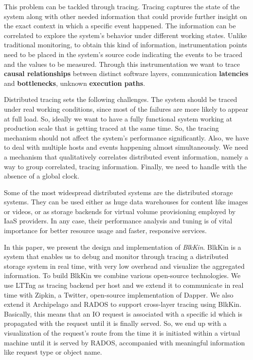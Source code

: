 \documentclass[a4paper,10pt,twocolumn]{article}
\begin{document}
This problem can be tackled through tracing. Tracing captures the state of the
system along with other needed information that could provide further insight on
the exact context in which a specific event happened. The information can be
correlated to explore the system's behavior under different working states.
Unlike traditional monitoring, to obtain this kind of information,
instrumentation points need to be placed in the system's source code indicating
the events to be traced and the values to be measured. Through this
instrumentation we want to trace \textbf{causal relationships} between distinct
software layers, communication \textbf{latencies} and \textbf{bottlenecks},
unknown \textbf{execution paths}.

Distributed tracing sets the following challenges. The system should be traced
under real working conditions, since most of the failures are more likely to
appear at full load. So, ideally we want to have a fully functional system
working at production scale that is getting traced at the same time. So, the
tracing mechanism should not affect the system's performance significantly.
Also, we have to deal with multiple hosts and events happening almost
simultaneously. We need a mechanism that qualitatively correlates distributed
event information, namely a way to group correlated, tracing information.
Finally, we need to handle with the absence of a global clock.

Some of the most widespread distributed systems are the distributed storage
systems. They can be used either as huge data warehouses for content like images
or videos, or as storage backends for virtual volume provisioning employed by
IaaS providers. In any case, their performance analysis and tuning is of vital
importance for better resource usage and faster, responsive services.

In this paper, we present the design and implementation of \emph{BlkKin}.
BlkKin is a system that enables us to debug and monitor through tracing a
distributed storage system in real time, with very low overhead and visualize
the aggregated information. To build BlkKin we combine various open-source
technologies. We use LTTng as tracing backend per host and we extend it to
communicate in real time with Zipkin, a Twitter, open-source implementation of
Dapper\cite{}. We also extend it Archipelago\cite{} and RADOS\cite{} to support
cross-layer tracing using BlkKin. Basically, this means that an IO request is
associated with a specific id which is propagated with the request until it is
finally served. So, we end up with a visualization of the request's route from
the time it is initiated within a virtual machine until it is served by RADOS,
accompanied with meaningful information like request type or object name.
\end{document}
